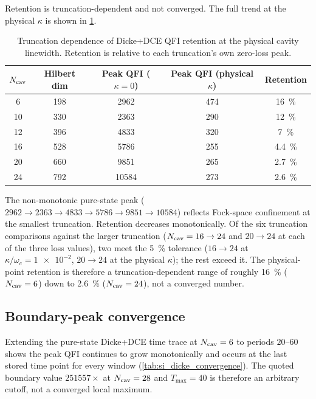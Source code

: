 \documentclass[aps,prxquantum,preprint,superscriptaddress,amsmath,amssymb]{revtex4-2}
\begin{document}
Retention is truncation-dependent and not converged. The full trend at the physical $\kappa$ is shown in \cref{tab:si_dicke_loss_convergence}.

\begin{table}[hbt!]
\centering
\caption{Truncation dependence of Dicke+DCE QFI retention at the physical cavity linewidth. Retention is relative to each truncation's own zero-loss peak.}
\label{tab:si_dicke_loss_convergence}
\begin{tabular}{c c c c c}
\toprule
{$N_{\rm cav}$} & {Hilbert dim} & {Peak QFI ($\kappa=0$)} & {Peak QFI (physical $\kappa$)} & {Retention} \\
\midrule
\num{6}  & \num{198} & \num{2962}  & \num{474}  & \qty{16}{\percent} \\
\num{10} & \num{330} & \num{2363}  & \num{290}  & \qty{12}{\percent} \\
\num{12} & \num{396} & \num{4833}  & \num{320}  & \qty{7}{\percent}  \\
\num{16} & \num{528} & \num{5786}  & \num{255}  & \qty{4.4}{\percent} \\
\num{20} & \num{660} & \num{9851}  & \num{265}  & \qty{2.7}{\percent} \\
\num{24} & \num{792} & \num{10584} & \num{273}  & \qty{2.6}{\percent} \\
\bottomrule
\end{tabular}
\end{table}

The non-monotonic pure-state peak ($\num{2962}\to\num{2363}\to\num{4833}\to\num{5786}\to\num{9851}\to\num{10584}$) reflects Fock-space confinement at the smallest truncation. Retention decreases monotonically. Of the six truncation comparisons against the larger truncation ($N_{\rm cav}=\num{16}\to\num{24}$ and $\num{20}\to\num{24}$ at each of the three loss values), two meet the \qty{5}{\percent} tolerance ($\num{16}\to\num{24}$ at $\kappa/\omega_c=\num{1e-2}$, $\num{20}\to\num{24}$ at the physical $\kappa$); the rest exceed it. The physical-point retention is therefore a truncation-dependent range of roughly \qty{16}{\percent} ($N_{\rm cav}=\num{6}$) down to \qty{2.6}{\percent} ($N_{\rm cav}=\num{24}$), not a converged number.

\subsection{Boundary-peak convergence}
\label{sec:si_dicke_convergence}

Extending the pure-state Dicke+DCE time trace at $N_{\rm cav}=\num{6}$ to periods $\num{20}$--$\num{60}$ shows the peak QFI continues to grow monotonically and occurs at the last stored time point for every window (\cref{tab:si_dicke_convergence}). The quoted boundary value $\num{251557}\times$ at $N_{\rm cav}=\num{28}$ and $T_{\max}=\num{40}$ is therefore an arbitrary cutoff, not a converged local maximum.
\end{document}
